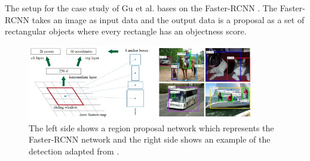 The setup for the case study of Gu et al. bases on the Faster-RCNN \cite{DBLP:conf/nips/RenHGS15}. The Faster-RCNN takes an image as input data and the output data is a proposal as a set of rectangular objects where every rectangle has an objectness score.

\begin{figure}[ht!]
  \centering
  \includegraphics[width=10cm]{pictures/f_rcnn.jpg}
  \caption{The left side shows a region proposal network which represents the Faster-RCNN network and the right side shows an example of the detection adapted from \cite{DBLP:conf/nips/RenHGS15}.}
  \label{fig:f_rcnn}
\end{figure}

